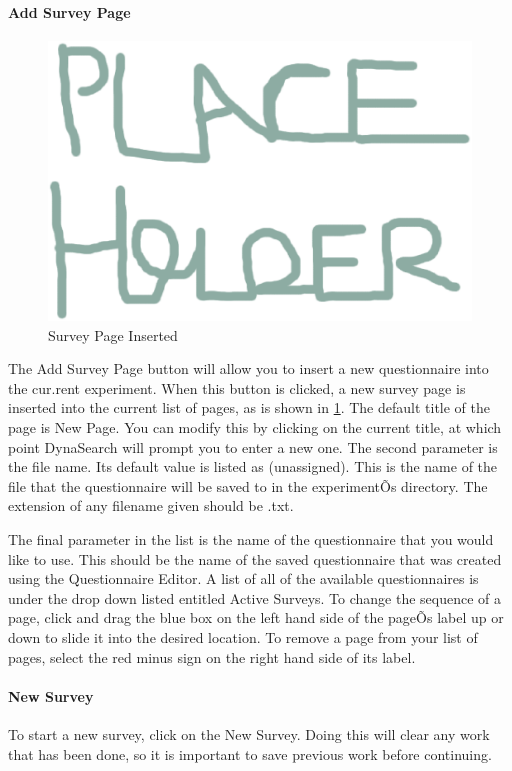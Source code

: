 \documentclass[article]{ij4uq}              %
\begin{document}
\paragraph{Add Survey Page}

\begin{figure}[h!]
 \centering
 \includegraphics[width=5.0in]{figures/place.eps}
 \caption{Survey Page Inserted}
 \label{fig:surveyInsert}
\end{figure}
\FloatBarrier

The Add Survey Page button will allow you to insert a new questionnaire into the cur.rent experiment. When this button is clicked, a new survey page is inserted into the current list of pages, as is shown in \ref{fig:surveyInsert}. The default title of the page is New Page. You can modify this by clicking on the current title, at which point DynaSearch will prompt you to enter a new one. The second parameter is the file name. Its default value is listed as (unassigned). This is the name of the file that the questionnaire will be saved to in the experimentÕs directory. The extension of any filename given should be .txt.

The final parameter in the list is the name of the questionnaire that you would like to use. This should be the name of the saved questionnaire that was created using the Questionnaire Editor. A list of all of the available questionnaires is under the drop down listed entitled Active Surveys. 
To change the sequence of a page, click and drag the blue box on the left hand side of the pageÕs label up or down to slide it into the desired location. To remove a page from your list of pages, select the red minus sign on the right hand side of its label.

\paragraph{New Survey}
To start a new survey, click on the New Survey. Doing this will clear any work that has been done, so it is important to save previous work before continuing.
\end{document}

